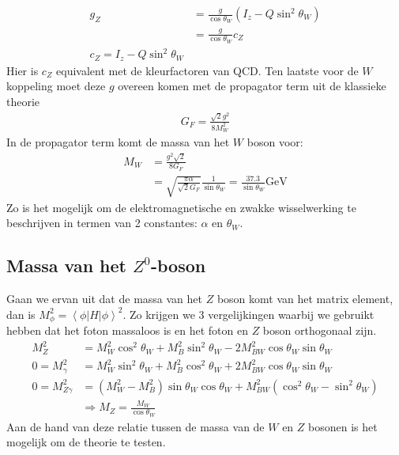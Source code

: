 \documentclass[../main.tex]{subfiles}
\begin{document}
\begin{equation}
    \begin{aligned}
        \label{eq:koppeling_z}
        g_Z &= \frac{g}{\cos\theta_W} (I_z - Q\sin^2\theta_W)\\
            &= \frac{g}{\cos\theta_W} c_Z\\
            c_Z = I_z - Q\sin^2\theta_W
    \end{aligned}
\end{equation}
Hier is $c_Z$ equivalent met de kleurfactoren van QCD. Ten laatste voor de $W$ koppeling moet deze $g$ overeen komen met de propagator term uit de klassieke theorie
\begin{equation}
    \begin{aligned}
        \label{eq:koppeling_w}
        G_F = \frac{\sqrt{2}g^2}{8M_W^2} 
    \end{aligned}
\end{equation}
In de propagator term komt de massa van het $W$ boson voor:
\begin{equation}
    \begin{aligned}
        \label{eq:massa_w}
        M_W &= \frac{g^2\sqrt{2}}{8G_F} \\
            &= \sqrt{ \frac{\pi\alpha}{\sqrt{2}G_F}} \frac{1}{\sin\theta_W} = \frac{37.3}{\sin\theta_W} \text{GeV}
    \end{aligned}
\end{equation}
Zo is het mogelijk om de elektromagnetische en zwakke wisselwerking te beschrijven in termen van 2 constantes: $\alpha$ en $\theta_W$.

\subsection{Massa van het $Z^0$-boson}%
\label{sub:massa_van_het_z_0_boson}

Gaan we ervan uit dat de massa van het $Z$ boson komt van het matrix element, dan is $M_\phi^2 = \left<\phi|H|\phi\right>^2$. Zo krijgen we 3 vergelijkingen waarbij we gebruikt hebben dat het foton massaloos is en het foton en $Z$ boson orthogonaal zijn.
\begin{equation}
    \begin{aligned}
        \label{eq:massa_z}
        M_Z^2 &= M_W^2 \cos^2\theta_W + M_B^2\sin^2\theta_W - 2M_{BW}^2\cos\theta_W\sin\theta_W\\
        0=M_\gamma^2 &= M_W^2 \sin^2\theta_W + M_B^2\cos^2\theta_W + 2M_{BW}^2\cos\theta_W\sin\theta_W\\
        0=M_{Z\gamma}^2 &= (M_W^2-M_B^2) \sin\theta_W\cos\theta_W + M_{BW}^2(\cos^2\theta_W-\sin^2\theta_W)\\
                        &\Rightarrow M_Z = \frac{M_W}{\cos\theta_W}
    \end{aligned}
\end{equation}
Aan de hand van deze relatie tussen de massa van de $W$ en $Z$ bosonen is het mogelijk om de theorie te testen.
\end{document}
